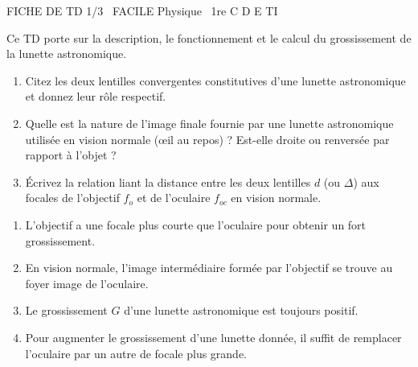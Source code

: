 \documentclass[11pt]{article}
\begin{document}
\begin{tcolorbox}[enhanced,colback=popink,colframe=popink,arc=10pt,boxrule=0pt,left=12pt,right=12pt,top=9pt,bottom=9pt]
{\color{white}\popxbold\small FICHE DE TD 1/3 \textbullet\ FACILE \hfill Physique \textbullet\ 1re C D E TI\par}
\end{tcolorbox}
\vspace{4pt}
Ce TD porte sur la description, le fonctionnement et le calcul du grossissement de la lunette astronomique.

\begin{exercice}
\begin{enumerate}
    \item Citez les deux lentilles convergentes constitutives d'une lunette astronomique et donnez leur rôle respectif.
    \item Quelle est la nature de l'image finale fournie par une lunette astronomique utilisée en vision normale (œil au repos) ? Est-elle droite ou renversée par rapport à l'objet ?
    \item Écrivez la relation liant la distance entre les deux lentilles $d$ (ou $\Delta$) aux focales de l'objectif $f_o$ et de l'oculaire $f_{oc}$ en vision normale.
\end{enumerate}
\end{exercice}

\begin{exercice}
\begin{enumerate}
    \item L'objectif a une focale plus courte que l'oculaire pour obtenir un fort grossissement.
    \item En vision normale, l'image intermédiaire formée par l'objectif se trouve au foyer image de l'oculaire.
    \item Le grossissement $G$ d'une lunette astronomique est toujours positif.
    \item Pour augmenter le grossissement d'une lunette donnée, il suffit de remplacer l'oculaire par un autre de focale plus grande.
\end{enumerate}
\end{exercice}
\end{document}

